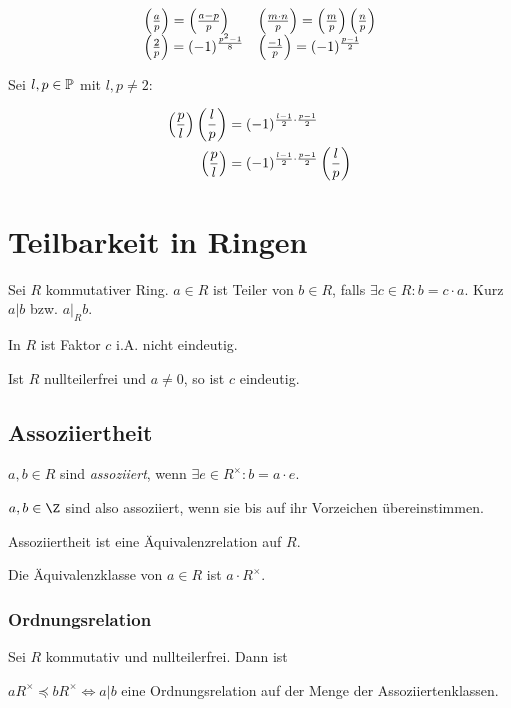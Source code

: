 \vspace*{-2mm}
\[ \begin{array}{ll}
\left(\frac{a}{p}\right) = \left(\frac{a-p}{p}\right) & \left(\frac{m \cdot n}{p}\right) = \left(\frac{m}{p}\right)\left(\frac{n}{p}\right) \\
\left(\frac{2}{p}\right) = (-1)^{\frac{p^2-1}{8}} & \left(\frac{-1}{p}\right) = (-1)^{\frac{p-1}{2}}
\end{array} \]

Sei $l, p \in \mathbb{P}$ mit $l, p \neq 2$:

\vspace*{-4mm}
\begin{align*}
	\left(\frac{p}{l}\right)\left(\frac{l}{p}\right) &= (-1)^{\frac{l-1}{2}\cdot\frac{p-1}{2}} \\
	\left(\frac{p}{l}\right) &= (-1)^{\frac{l-1}{2}\cdot\frac{p-1}{2}} \left(\frac{l}{p}\right)
\end{align*}

\section*{Teilbarkeit in Ringen}

Sei $R$ kommutativer Ring. $a \in R$ ist Teiler von $b \in R$, falls $\exists c \in R : b = c \cdot a$. Kurz $a | b$ bzw. $a |_R b$.

In $R$ ist Faktor $c$ i.A. nicht eindeutig.

Ist $R$ nullteilerfrei und $a \neq 0$, so ist $c$ eindeutig.

\subsection*{Assoziiertheit}

$a, b \in R$ sind \emph{assoziiert}, wenn $\exists e \in R^\times : b = a\cdot e$.

$a, b \in \Z$ sind also assoziiert, wenn sie bis auf ihr Vorzeichen übereinstimmen.

Assoziiertheit ist eine Äquivalenzrelation auf $R$.

Die Äquivalenzklasse von $a \in R$ ist $a \cdot R^\times$.

\subsubsection*{Ordnungsrelation}

Sei $R$ kommutativ und nullteilerfrei. Dann ist

$aR^\times \preccurlyeq bR^\times \iff a | b$ eine Ordnungsrelation auf der Menge der Assoziiertenklassen.

